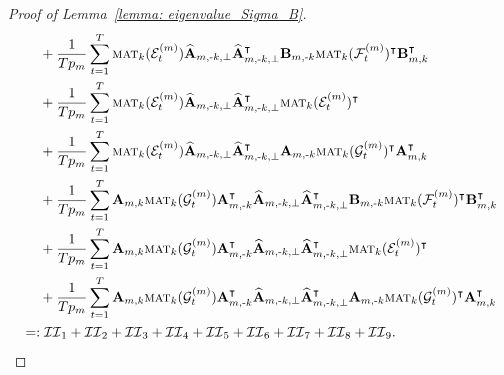 \documentclass[aos]{imsart}
\theoremstyle{plain}
\theoremstyle{definition}
\def\mat{\textnormal{\textsc{mat}}}
\def\wh#1{\widehat{#1}}
\def\cE{\mathcal{E}}
\def\cF{\mathcal{F}}
\def\cG{\mathcal{G}} \def\cH{\boldsymbol{\mathcal{H}}} \def\cI{\mathcal{I}}
\def\cII{\mathcal{II}}
\def\bA{\mathbf{A}}
\def\bB{\mathbf{B}}
\def\trans{\intercal}
\begin{document}
\begin{proof}[Proof of Lemma~\ref{lemma: eigenvalue_Sigma_B}]
\begin{align}
    &\;\quad
    + \frac{1}{Tp_m} \sum_{t=1}^T \mat_k(\cE_t^{(m)}) \wh{\bA}_{m,\text{-}k,\perp} \wh{\bA}_{m,\text{-}k,\perp}^\trans \bB_{m,\text{-}k} \mat_k(\cF_t^{(m)})^\trans \bB_{m,k}^\trans \notag \\
    &\;\quad
    + \frac{1}{Tp_m} \sum_{t=1}^T \mat_k(\cE_t^{(m)}) \wh{\bA}_{m,\text{-}k,\perp} \wh{\bA}_{m,\text{-}k,\perp}^\trans \mat_k(\cE_t^{(m)})^\trans \notag \\
    &\;\quad
    + \frac{1}{Tp_m} \sum_{t=1}^T \mat_k(\cE_t^{(m)}) \wh{\bA}_{m,\text{-}k,\perp} \wh{\bA}_{m,\text{-}k,\perp}^\trans \bA_{m,\text{-}k} \mat_k(\cG_t^{(m)})^\trans \bA_{m,k}^\trans \notag \\
    &\;\quad
    + \frac{1}{Tp_m} \sum_{t=1}^T \bA_{m,k} \mat_k(\cG_t^{(m)}) \bA_{m,\text{-}k}^\trans \wh{\bA}_{m,\text{-}k,\perp} \wh{\bA}_{m,\text{-}k,\perp}^\trans \bB_{m,\text{-}k} \mat_k(\cF_t^{(m)})^\trans \bB_{m,k}^\trans \notag \\
    &\;\quad
    + \frac{1}{Tp_m} \sum_{t=1}^T \bA_{m,k} \mat_k(\cG_t^{(m)}) \bA_{m,\text{-}k}^\trans \wh{\bA}_{m,\text{-}k,\perp} \wh{\bA}_{m,\text{-}k,\perp}^\trans \mat_k(\cE_t^{(m)})^\trans \notag \\
    &\;\quad
    + \frac{1}{Tp_m} \sum_{t=1}^T \bA_{m,k} \mat_k(\cG_t^{(m)}) \bA_{m,\text{-}k}^\trans \wh{\bA}_{m,\text{-}k,\perp} \wh{\bA}_{m,\text{-}k,\perp}^\trans \bA_{m,\text{-}k} \mat_k(\cG_t^{(m)})^\trans \bA_{m,k}^\trans \notag \\
    &=:
    \cII_1 + \cII_2 + \cII_3 + \cII_4 + \cII_5 + \cII_6 + \cII_7 + \cII_8 + \cII_9 .
    \label{eqn: decomp_Sigma_B}
\end{align}



\end{proof}
\end{document}

